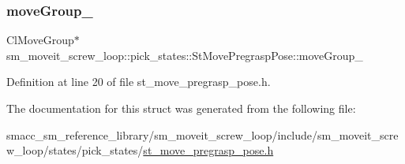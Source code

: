 \subsubsection{\texorpdfstring{move\+Group\+\_\+}{moveGroup\_}}
{\footnotesize\ttfamily Cl\+Move\+Group$\ast$ sm\+\_\+moveit\+\_\+screw\+\_\+loop\+::pick\+\_\+states\+::\+St\+Move\+Pregrasp\+Pose\+::move\+Group\+\_\+}



Definition at line 20 of file st\+\_\+move\+\_\+pregrasp\+\_\+pose.\+h.



The documentation for this struct was generated from the following file\+:\begin{DoxyCompactItemize}
\item 
smacc\+\_\+sm\+\_\+reference\+\_\+library/sm\+\_\+moveit\+\_\+screw\+\_\+loop/include/sm\+\_\+moveit\+\_\+screw\+\_\+loop/states/pick\+\_\+states/\hyperlink{sm__moveit__screw__loop_2include_2sm__moveit__screw__loop_2states_2pick__states_2st__move__pregrasp__pose_8h}{st\+\_\+move\+\_\+pregrasp\+\_\+pose.\+h}\end{DoxyCompactItemize}
